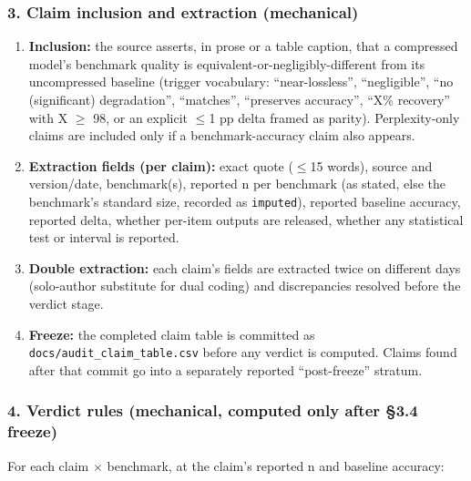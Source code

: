 \subsubsection{3. Claim inclusion and extraction (mechanical)}
\begin{enumerate}
\item \textbf{Inclusion:} the source asserts, in prose or a table caption, that a compressed model's benchmark quality is equivalent-or-negligibly-different from its uncompressed baseline (trigger vocabulary: ``near-lossless'', ``negligible'', ``no (significant) degradation'', ``matches'', ``preserves accuracy'', ``X\% recovery'' with X $\geq$ 98, or an explicit $\leq$1 pp delta framed as parity). Perplexity-only claims are included only if a benchmark-accuracy claim also appears.
\item \textbf{Extraction fields (per claim):} exact quote ($\leq$15 words), source and version/date, benchmark(s), reported n per benchmark (as stated, else the benchmark's standard size, recorded as \texttt{imputed}), reported baseline accuracy, reported delta, whether per-item outputs are released, whether any statistical test or interval is reported.
\item \textbf{Double extraction:} each claim's fields are extracted twice on different days (solo-author substitute for dual coding) and discrepancies resolved before the verdict stage.
\item \textbf{Freeze:} the completed claim table is committed as \texttt{docs/\allowbreak{}audit\_claim\_table.csv} before any verdict is computed. Claims found after that commit go into a separately reported ``post-freeze'' stratum.
\end{enumerate}
\subsubsection{4. Verdict rules (mechanical, computed only after \S{}3.4 freeze)}
For each claim $\times$ benchmark, at the claim's reported n and baseline accuracy:

